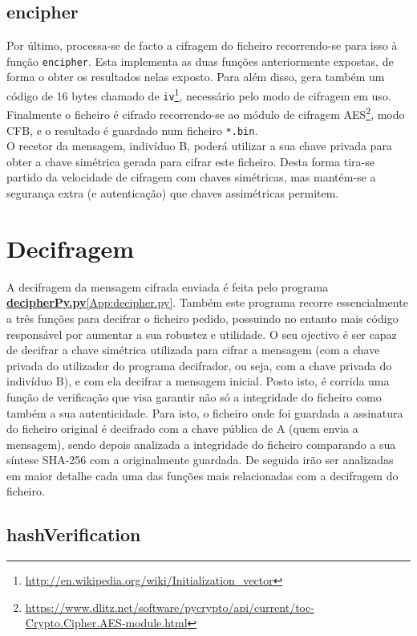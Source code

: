 \documentclass[a4paper,11pt,openright,oneside]{report}
\begin{document}
\subsection{encipher}

Por último, processa-se de facto a cifragem do ficheiro recorrendo-se para isso à função \verb|encipher|. Esta implementa as duas funções anteriormente expostas, de forma o obter os resultados nelas exposto. Para além disso, gera também um código de 16 bytes chamado de \verb|iv|\footnote{\url{http://en.wikipedia.org/wiki/Initialization_vector}}, necessário pelo modo de cifragem em uso. Finalmente o ficheiro é cifrado recorrendo-se ao módulo de cifragem AES\footnote{\url{https://www.dlitz.net/software/pycrypto/api/current/toc-Crypto.Cipher.AES-module.html}}, modo CFB, e o resultado é guardado num ficheiro \verb|*.bin|.\\
O recetor da mensagem, indivíduo B, poderá utilizar a sua chave privada para obter a chave simétrica gerada para cifrar este ficheiro. Desta forma tira-se partido da velocidade de cifragem com chaves simétricas, mas mantém-se a segurança extra (e autenticação) que chaves assimétricas permitem.

\section{Decifragem}

A decifragem da mensagem cifrada enviada é feita pelo programa \href{../Python/Receiver/decipherPy.py}{\textbf{decipherPy.py}}\ref{App:decipher.py}. Também este programa recorre essencialmente a três funções para decifrar o ficheiro pedido, possuindo no entanto mais código responsável por aumentar a sua robustez e utilidade. O seu ojectivo é ser capaz de decifrar a chave simétrica utilizada para cifrar a mensagem (com a chave privada do utilizador do programa decifrador, ou seja, com a chave privada do indivíduo B), e com ela decifrar a mensagem inicial. Posto isto, é corrida uma função de verificação que visa garantir não só a integridade do ficheiro como também a sua autenticidade. Para isto, o ficheiro onde foi guardada a assinatura do ficheiro original é decifrado com a chave pública de A (quem envia a mensagem), sendo depois analizada a integridade do ficheiro comparando a sua síntese SHA-256 com a originalmente guardada. De seguida irão ser analizadas em maior detalhe cada uma das funções mais relacionadas com a decifragem do ficheiro.

\subsection{hashVerification}
\end{document}
